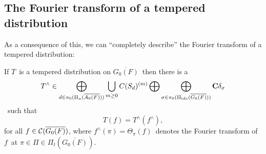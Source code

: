 \subsection{The Fourier transform of a tempered distribution}

As a consequence of this, we can ``completely describe'' the Fourier
transform of a tempered distribution:

\begin{theorem}
If $T$\ is a tempered distribution on $\overline{G_0(F)}$\ then there is a 
\[
T^{\wedge }\in \bigoplus_{d\in \pi _0(\Pi _u(\overline{A_0(F)}%
))}\bigcup_{m\geq 0}C(S_d)^{(m)}\bigoplus \bigoplus_{\sigma \in \pi _0(\Pi
_{lds}(\overline{G_0(F)}))}{\bf C}\delta _\sigma 
\]
\ such that 
\[
T(f)=T^{\wedge }(f^{\wedge }),
\]
for all $f\in {\cal C}(\overline{G_0(F)})$, where $f^{\wedge }(\pi )=\Theta
_\pi (f)$\ denotes the Fourier transform of $f$\ at $\pi \in \Pi \in \Pi _t(%
\overline{G_0(F)}).$
\end{theorem}



